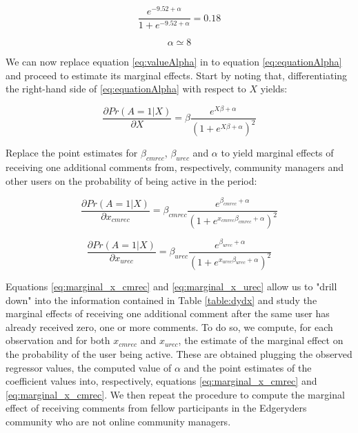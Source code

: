 \begin{equation}
	\frac{e^{-9.52 + \alpha}}{1 + e^{-9.52 + \alpha}} = 0.18
\end{equation}

\begin{equation}
	\alpha \simeq 8
	\label{eq:valueAlpha}
\end{equation}

We can now replace equation \ref{eq:valueAlpha} in to equation \ref{eq:equationAlpha} and proceed to estimate its marginal effects. Start by noting that, differentiating the right-hand side of \ref{eq:equationAlpha} with respect to $X$ yields:

\begin{equation}
	\frac{\partial Pr(A=1|X)}{\partial X} = \beta \frac{e^{X \beta + \alpha}}{(1 + e^{X \beta + \alpha})^2} 
\end{equation}

Replace the point estimates for $\beta_{cmrec}$, $\beta_{urec}$ and $\alpha$ to yield marginal effects of receiving one additional comments from, respectively, community managers and other users on the probability of being active in the period: 

\begin{equation}
	\frac{\partial Pr(A=1|X)}{\partial x_{cmrec}} = \beta_{cmrec} \frac{e^{ \beta_{cmrec} + \alpha}}{(1 + e^{x_{cmrec} \beta_{cmrec} + \alpha})^2} 
	\label{eq:marginal_x_cmrec}
\end{equation}

\begin{equation}
	\frac{\partial Pr(A=1|X)}{\partial x_{urec}} = \beta_{urec} \frac{e^{ \beta_{urec} + \alpha}}{(1 + e^{x_{urec} \beta_{urec} + \alpha})^2} 
	\label{eq:marginal_x_urec}
\end{equation}

Equations \ref{eq:marginal_x_cmrec} and \ref{eq:marginal_x_urec} allow us to "drill down" into the information contained in Table \ref{table:dydx} and study the marginal effects of receiving one additional comment after the same user has already received zero, one or more comments. To do so, we compute, for each observation and for both $x_{cmrec}$ and $x_{urec}$, the estimate of the marginal effect on the probability of the user being active. These are obtained plugging the observed regressor values, the computed value of $\alpha$ and the point estimates of the coefficient values into, respectively, equations \ref{eq:marginal_x_cmrec} and \ref{eq:marginal_x_cmrec}. We then repeat the procedure to compute the marginal effect of receiving comments from fellow participants in the Edgeryders community who are not online community managers. 

